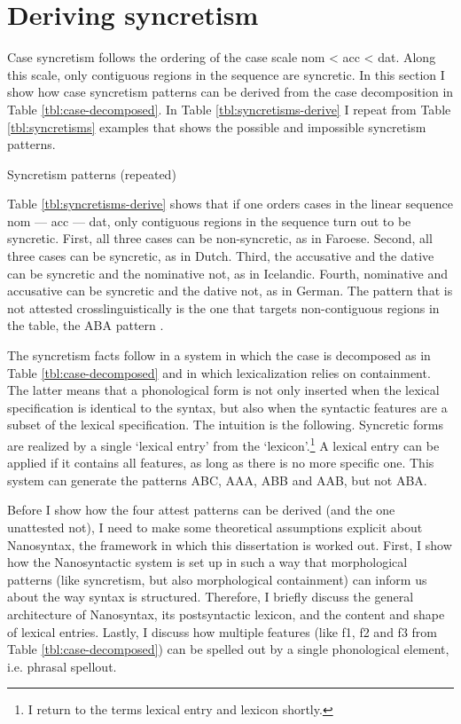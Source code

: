 \section{Deriving syncretism}\label{sec:syncretism}

Case syncretism follows the ordering of the case scale \ac{nom} < \ac{acc} < \ac{dat}. Along this scale, only contiguous regions in the sequence are syncretic. In this section I show how case syncretism patterns can be derived from the case decomposition in Table \ref{tbl:case-decomposed}.
In Table \ref{tbl:syncretisms-derive} I repeat from Table \ref{tbl:syncretisms} examples that shows the possible and impossible syncretism patterns.

\begin{table}[ht]
  \center
  \caption {Syncretism patterns (repeated)}
    
  \label{tbl:syncretisms-derive}
\end{table}


Table \ref{tbl:syncretisms-derive} shows that if one orders cases in the linear sequence \ac{nom} --- \ac{acc} --- \ac{dat}, only contiguous regions in the sequence turn out to be syncretic. First, all three cases can be non-syncretic, as in Faroese. Second, all three cases can be syncretic, as in Dutch. Third, the accusative and the dative can be syncretic and the nominative not, as in Icelandic. Fourth, nominative and accusative can be syncretic and the dative not, as in German. The pattern that is not attested crosslinguistically is the one that targets non-contiguous regions in the table, the ABA pattern \citep{baerman2005,caha2009,zompi2017}.

The syncretism facts follow in a system in which the case is decomposed as in Table \ref{tbl:case-decomposed} and in which lexicalization relies on containment. The latter means that a phonological form is not only inserted when the lexical specification is identical to the syntax, but also when the syntactic features are a subset of the lexical specification. The intuition is the following. Syncretic forms are realized by a single `lexical entry' from the `lexicon'.\footnote{
I return to the terms lexical entry and lexicon shortly.
} A lexical entry can be applied if it contains all features, as long as there is no more specific one. This system can generate the patterns ABC, AAA, ABB and AAB, but not ABA.

Before I show how the four attest patterns can be derived (and the one unattested not), I need to make some theoretical assumptions explicit about Nanosyntax, the framework in which this dissertation is worked out. First, I show how the Nanosyntactic system is set up in such a way that morphological patterns (like syncretism, but also morphological containment) can inform us about the way syntax is structured. Therefore, I briefly discuss the general architecture of Nanosyntax, its postsyntactic lexicon, and the content and shape of lexical entries. Lastly, I discuss how multiple features (like \ac{f}1, \ac{f}2 and \ac{f}3 from Table \ref{tbl:case-decomposed}) can be spelled out by a single phonological element, i.e. phrasal spellout.

